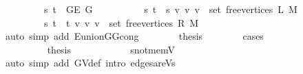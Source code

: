 \begin{isabellebody}
\isanewline
\ \ \ \ \ \ \ \ {\isacharparenleft}{\kern0pt}{}{\isacharparenright}{\kern0pt}\ {\isachardoublequoteopen}{\isacharbraceleft}{\kern0pt}s{\isacharcomma}{\kern0pt}\ t{\isacharbraceright}{\kern0pt}\ {\isasymin}\ G{\isachardot}{\kern0pt}E\ G{\isachardoublequoteclose}\ {\isacharbar}{\kern0pt}\isanewline
\ \ \ \ \ \ \ \ {\isacharparenleft}{\kern0pt}{}{\isacharparenright}{\kern0pt}\ {\isachardoublequoteopen}{\isacharbraceleft}{\kern0pt}s{\isacharcomma}{\kern0pt}\ t{\isacharbraceright}{\kern0pt}\ {\isasymin}\ {\isacharbraceleft}{\kern0pt}{\isacharbraceleft}{\kern0pt}s{\isacharcomma}{\kern0pt}\ v{\isacharbraceright}{\kern0pt}\ {\isacharbar}{\kern0pt}v{\isachardot}{\kern0pt}\ v\ {\isasymin}\ set\ {\isacharparenleft}{\kern0pt}free{\isacharunderscore}{\kern0pt}vertices\ L\ M{\isacharparenright}{\kern0pt}{\isacharbraceright}{\kern0pt}{\isachardoublequoteclose}\ {\isacharbar}{\kern0pt}\isanewline
\ \ \ \ \ \ \ \ {\isacharparenleft}{\kern0pt}{}{\isacharparenright}{\kern0pt}\ {\isachardoublequoteopen}{\isacharbraceleft}{\kern0pt}s{\isacharcomma}{\kern0pt}\ t{\isacharbraceright}{\kern0pt}\ {\isasymin}\ {\isacharbraceleft}{\kern0pt}{\isacharbraceleft}{\kern0pt}t{\isacharcomma}{\kern0pt}\ v{\isacharbraceright}{\kern0pt}\ {\isacharbar}{\kern0pt}v{\isachardot}{\kern0pt}\ v\ {\isasymin}\ set\ {\isacharparenleft}{\kern0pt}free{\isacharunderscore}{\kern0pt}vertices\ R\ M{\isacharparenright}{\kern0pt}{\isacharbraceright}{\kern0pt}{\isachardoublequoteclose}\isanewline
\ \ \ \ \ \ \ \ \isamarkupfalse%
\ {\isacharparenleft}{\kern0pt}auto\ simp\ add{\isacharcolon}{\kern0pt}\ E{\isacharunderscore}{\kern0pt}union{\isacharunderscore}{\kern0pt}G{}{\isacharunderscore}{\kern0pt}G{}{\isacharunderscore}{\kern0pt}cong{\isacharparenright}{\kern0pt}\isanewline
\ \ \ \ \ \ \isamarkupfalse%
\ {\isacharquery}{\kern0pt}thesis\isanewline
\ \ \ \ \ \ \isamarkupfalse%
\ {\isacharparenleft}{\kern0pt}cases{\isacharparenright}{\kern0pt}\isanewline
\ \ \ \ \ \ \ \ \isamarkupfalse%
\ {}\isanewline
\ \ \ \ \ \ \ \ \isamarkupfalse%
\ {\isacharquery}{\kern0pt}thesis\isanewline
\ \ \ \ \ \ \ \ \ \ \isamarkupfalse%
\ s{\isacharunderscore}{\kern0pt}not{\isacharunderscore}{\kern0pt}mem{\isacharunderscore}{\kern0pt}V\isanewline
\ \ \ \ \ \ \ \ \ \ \isamarkupfalse%
\ {\isacharparenleft}{\kern0pt}auto\ simp\ add{\isacharcolon}{\kern0pt}\ G{\isachardot}{\kern0pt}V{\isacharunderscore}{\kern0pt}def\ intro{\isacharcolon}{\kern0pt}\ edges{\isacharunderscore}{\kern0pt}are{\isacharunderscore}{\kern0pt}Vs{\isacharparenright}{\kern0pt}\isanewline

\end{isabellebody}
